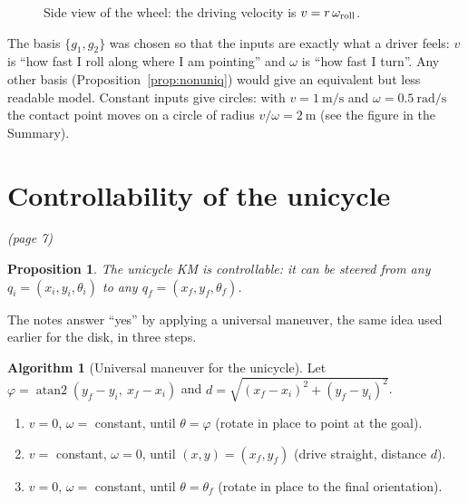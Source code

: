 \documentclass[11pt,a4paper]{article}
\theoremstyle{definition}
\newtheorem{algorithm}[definition]{Algorithm}
\theoremstyle{plain}
\newtheorem{proposition}[definition]{Proposition}
\theoremstyle{remark}
\begin{document}
\begin{figure}[h]
\centering
{}
\caption{Side view of the wheel: the driving velocity is $v=r\,\omega_{\rm roll}$.}\label{fig:wheel}
\end{figure}

\begin{intuition}
The basis $\{g_1,g_2\}$ was chosen so that the inputs are exactly what a driver feels: $v$ is ``how fast I roll along where I am pointing'' and $\omega$ is ``how fast I turn''. Any other basis (Proposition~\ref{prop:nonuniq}) would give an equivalent but less readable model. Constant inputs give circles: with $v=1\ \mathrm{m/s}$ and $\omega=0.5\ \mathrm{rad/s}$ the contact point moves on a circle of radius $v/\omega=2\ \mathrm m$ (see the figure in the Summary).
\end{intuition}

\section{Controllability of the unicycle}\emph{(page 7)}

\begin{proposition}\label{prop:unicycle-ctrl}
The unicycle KM is controllable: it can be steered from any $q_i=(x_i,y_i,\theta_i)$ to any $q_f=(x_f,y_f,\theta_f)$.
\end{proposition}

The notes answer ``yes'' by applying a universal maneuver, the same idea used earlier for the disk, in three steps.

\begin{algorithm}[Universal maneuver for the unicycle]\label{alg:maneuver}
Let $\varphi=\operatorname{atan2}(y_f-y_i,\ x_f-x_i)$ and $d=\sqrt{(x_f-x_i)^2+(y_f-y_i)^2}$.
\begin{enumerate}[nosep]
\item $v=0$, $\omega=$ constant, until $\theta=\varphi$ (rotate in place to point at the goal).
\item $v=$ constant, $\omega=0$, until $(x,y)=(x_f,y_f)$ (drive straight, distance $d$).
\item $v=0$, $\omega=$ constant, until $\theta=\theta_f$ (rotate in place to the final orientation).
\end{enumerate}
\end{algorithm}
\end{document}

